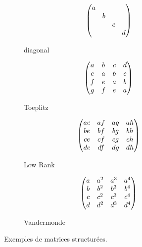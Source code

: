 
\begin{figure}[t]
   \centering
   \begin{subfigure}[t]{0.24\textwidth}
       \centering
       \begin{equation*}
	  \begin{pmatrix}
	    a &   &   &   \\
	      & b &   &   \\
	      &   & c &   \\
	      &   &   & d
	  \end{pmatrix}
       \end{equation*}
       \caption*{diagonal}
   \end{subfigure}
   \hfill
   \begin{subfigure}[t]{0.24\textwidth}
       \centering
       \begin{equation*}
	  \begin{pmatrix}
	    a & b & c & d \\
	    e & a & b & c \\
	    f & e & a & b \\
	    g & f & e & a
	  \end{pmatrix}
       \end{equation*}
       \caption*{Toeplitz}
   \end{subfigure}
   \hfill
   \begin{subfigure}[t]{0.24\textwidth}
       \centering
       \begin{equation*}
	  \begin{pmatrix}
	    ae & af & ag & ah \\
	    be & bf & bg & bh \\
	    ce & cf & cg & ch \\
	    de & df & dg & dh
	  \end{pmatrix}
       \end{equation*}
       \caption*{Low Rank}
   \end{subfigure}
   \hfill
   \begin{subfigure}[t]{0.24\textwidth}
       \centering
       \begin{equation*}
	  \begin{pmatrix}
	    a & a^2 & a^3 & a^4 \\
	    b & b^2 & b^3 & b^4 \\
	    c & c^2 & c^3 & c^4 \\
	    d & d^2 & d^3 & d^4
	  \end{pmatrix}
       \end{equation*}
       \caption*{Vandermonde}
   \end{subfigure}
  \caption{Exemples de matrices structurées.}
  \label{figure:ap7-example_structure_matrices}
\end{figure}

